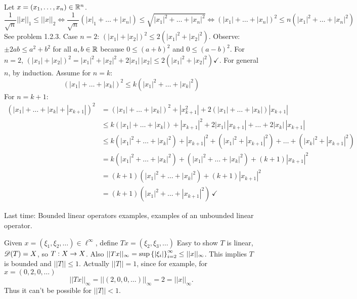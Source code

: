 \documentclass[]{article}
\begin{document}
Let $x=(x_1,\dots,x_n)\in\mathbb{R}^n$.
$$\frac1{\sqrt n} ||x||_1 \leq ||x||_2 \iff \frac1{\sqrt n}(|x|_1+\dots+|x_n|)\leq\sqrt{|x_1|^2+\dots+|x_n|^2} \iff (|x_1|+\dots+|x_n|)^2 \leq n(|x_1|^2 + \dots + |x_n|^2) $$
See problem 1.2.3.
Case $n=2$: $(|x_1|+|x_2|)^2\leq2(|x_1|^2+|x_2|^2)$.
Observe: $\pm 2ab\leq a^2+b^2$ for all $a,b\in\mathbb{R}$ because $0\leq (a+b)^2$ and $0\leq(a-b)^2$.
For $n=2$, $(|x_1|+|x_2|)^2 = |x_1|^2+|x_2|^2+2|x_1|\,|x_2| \leq 2(|x_1|^2+|x_2|^2) \checkmark$.
For general $n$, by induction.
Assume for $n=k$:
$$(|x_1|+\dots+|x_k|)^2\leq k(|x_1|^2+\dots+|x_k|^2)$$
For $n=k+1$:
\begin{align*}
	(|x_1|+\dots+|x_k|+|x_{k+1}|)^2 &= (|x_1|+\dots+|x_k|)^2 + |x_{k+1}^2| + 2(|x_1|+\dots+|x_k|)|x_{k+1}| \\
									&\leq k(|x_1|+\dots+|x_k|)+|x_{k+1}|^2 + 2|x_1|\,|x_{k+1}| + \dots + 2|x_k|\,|x_{k+1}| \\
									&\leq k(|x_1|^2+\dots+|x_k|^2)+|x_{k+1}|^2+(|x_1|^2+|x_{k+1}|^2)+\dots+(|x_k|^2+|x_{k+1}|^2) \\
									&= k(|x_1|^2+\dots+|x_k|^2)+(|x_1|^2+\dots+|x_k|^2) + (k+1)|x_{k+1}|^2 \\
									&= (k+1)(|x_1|^2+\dots+|x_k|^2) + (k+1)|x_{k+1}|^2 \\
									&= (k+1)(|x_1|^2+\dots+|x_{k+1}|^2)\,\checkmark
\end{align*}

Last time: Bounded linear operators examples, examples of an unbounded linear operator.

\begin{example}
	[$X=\ell^\infty$ with $||\cdot||_\infty$]
	Given $x=(\xi_1,\xi_2,\dots)\in\ell^\infty$, define $Tx = (\xi_2,\xi_3,\dots)$ 
	Easy to show $T$ is linear, $\mathscr{D}(T)=X$, so $T:X\rightarrow X$.
	Also $||Tx||_\infty = \sup\left\{ |\xi_i| \right\}_{i=2}^\infty\leq||x||_\infty$.
	This implies $T$ is bounded and $||T||\leq1$.
	Actually $||T||=1$, since for example, for $x=(0,2,0,\dots)$
	$$||Tx||_\infty = ||(2,0,0,\dots)||_\infty = 2 = ||x||_\infty.$$
	Thus it can't be possible for $||T||<1$.
\end{example}
\end{document}
